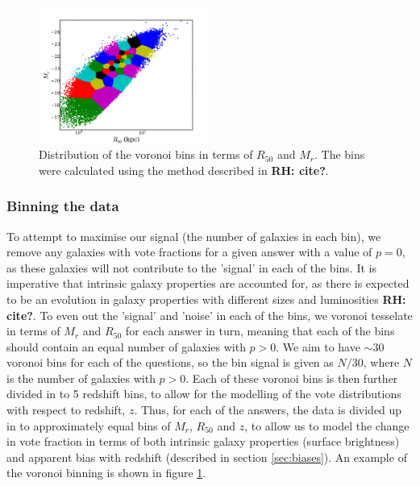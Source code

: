 \documentclass[useAMS,usenatbib]{mn2e}
\newcommand{\rh}[1]{{\bf \textcolor{RoyalPurple}{RH: #1}}}
\begin{document}
\begin{figure}
		\centering

        \includegraphics[width=0.5\textwidth]{Bias_imgs/voronoi_bins.pdf}

        \caption{Distribution of the voronoi bins in terms of $R_{50}$ and $M_r$. The bins were calculated using the method described in \rh{cite?}.}

        \label{fig:voronoi_bins}

\end{figure}

\subsubsection{Binning the data}

To attempt to maximise our signal (the number of galaxies in each bin), we remove any galaxies with vote fractions for a given answer with a value of $p=0$, as these galaxies will not contribute to the 'signal' in each of the bins. It is imperative that intrinsic galaxy properties are accounted for, as there is expected to be an evolution in galaxy properties with different sizes and luminosities \rh{cite?}. To even out the 'signal' and 'noise' in each of the bins, we voronoi tesselate in terms of $M_r$ and $R_{50}$ for each answer in turn, meaning that each of the bins should contain an equal number of galaxies with $p>0$. We aim to have $\sim 30$ voronoi bins for each of the questions, so the bin signal is given as $N/30$, where $N$ is the number of galaxies with $p>0$. Each of these voronoi bins is then further divided in to 5 redshift bins, to allow for the modelling of the vote distributions with respect to redshift, $z$. Thus, for each of the answers, the data is divided up in to approximately equal bins of $M_r$, $R_{50}$ and $z$, to allow us to model the change in vote fraction in terms of both intrinsic galaxy properties (surface brightness) and apparent bias with redshift (described in section \ref{sec:biases}). An example of the voronoi binning is shown in figure \ref{fig:voronoi_bins}.
\end{document}
